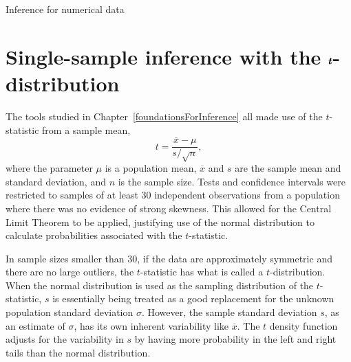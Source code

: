 \begin{chapterpage}{Inference for numerical data}
  \label{inferenceForNumericalData}
\end{chapterpage}
\renewcommand{\chapterfolder}{ch_inference_for_means_oi_biostat}



\section[{Single-sample inference with the $t$-distribution}]{Single-sample inference with the $\pmb{\MakeLowercase{t}}$-distribution}
\label{oneSampleMeansWithTDistribution}

\noindent%
The tools studied in Chapter~\ref{foundationsForInference} all made use of the $t$-statistic from a sample mean,
\[t = \frac{\overline{x} - \mu}{s/\sqrt{n}},\]
where the parameter $\mu$ is a population mean, $\overline{x}$ and $s$ are the sample mean and standard deviation, and $n$ is the sample size. Tests and confidence intervals were restricted to samples of at least 30 independent observations from a population where there was no evidence of strong skewness. This allowed for the Central Limit Theorem to be applied, justifying use of the normal distribution to calculate probabilities associated with the $t$-statistic. 

In sample sizes smaller than 30, if the data are approximately symmetric and there are no large outliers, the $t$-statistic has what is called a $t$-distribution. When the normal distribution is used as the sampling distribution of the $t$-statistic, $s$ is essentially being treated as a good replacement for the unknown population standard deviation $\sigma$. However, the sample standard deviation $s$, as an estimate of $\sigma$, has its own inherent variability like $\overline{x}$. The $t$ density function adjusts for the variability in $s$ by having more probability in the left and right tails than the normal distribution.

